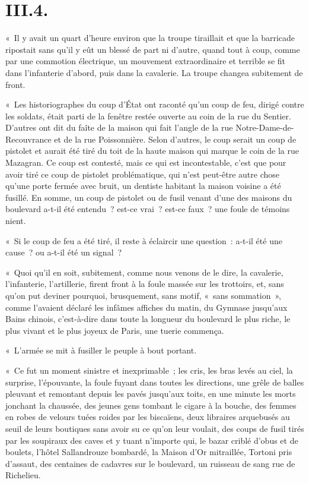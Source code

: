 \documentclass[french,twoside]{book} %
\begin{document}
\section[{III.4.}]{III.4.}

\noindent « Il y avait un quart d’heure environ que la troupe tiraillait et que la barricade ripostait sans qu’il y eût un blessé de part ni d’autre, quand tout à coup, comme par une commotion électrique, un mouvement extraordinaire et terrible se fit dans l’infanterie d’abord, puis dans la cavalerie. La troupe changea subitement de front.\par
« Les historiographes du coup d’État ont raconté qu’un coup de feu, dirigé contre les soldats, était parti de la fenêtre restée ouverte au coin de la rue du Sentier. D’autres ont dit du faîte de la maison qui fait l’angle de la rue Notre-Dame-de-Recouvrance et de la rue Poissonnière. Selon d’autres, le coup serait un coup de pistolet et aurait été tiré du toit de la haute maison qui marque le coin de la rue Mazagran. Ce coup est contesté, mais ce qui est incontestable, c’est que pour avoir tiré ce coup de pistolet problématique, qui n’est peut-être autre chose qu’une porte fermée avec bruit, un dentiste habitant la maison voisine a été fusillé. En somme, un coup de pistolet ou de fusil venant d’une des maisons du boulevard a-t-il été entendu ? est-ce vrai ? est-ce faux ? une foule de témoins nient.\par
« Si le coup de feu a été tiré, il reste à éclaircir une question : a-t-il été une cause ? ou a-t-il été un signal ?\par
« Quoi qu’il en soit, subitement, comme nous venons de le dire, la cavalerie, l’infanterie, l’artillerie, firent front à la foule massée sur les trottoirs, et, sans qu’on put deviner pourquoi, brusquement, sans motif, « sans sommation », comme l’avaient déclaré les infâmes affiches du matin, du Gymnase jusqu’aux Bains chinois, c’est-à-dire dans toute la longueur du boulevard le plus riche, le plus vivant et le plus joyeux de Paris, une tuerie commença.\par
« L’armée se mit à fusiller le peuple à bout portant.\par
« Ce fut un moment sinistre et inexprimable ; les cris, les bras levés au ciel, la surprise, l’épouvante, la foule fuyant dans toutes les directions, une grêle de balles pleuvant et remontant depuis les pavés jusqu’aux toits, en une minute les morts jonchant la chaussée, des jeunes gens tombant le cigare à la bouche, des femmes en robes de velours tuées roides par les biscaïens, deux libraires arquebusés au seuil de leurs boutiques sans avoir su ce qu’on leur voulait, des coups de fusil tirés par les soupiraux des caves et y tuant n’importe qui, le bazar criblé d’obus et de boulets, l’hôtel Sallandrouze bombardé, la Maison d’Or mitraillée, Tortoni pris d’assaut, des centaines de cadavres sur le boulevard, un ruisseau de sang rue de Richelieu.\par
\end{document}
